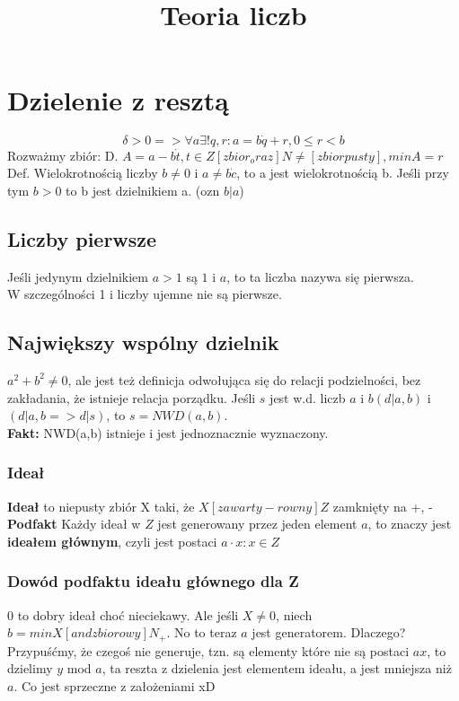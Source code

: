 \documentclass[12pt,a4paper,article]{memoir} %
\title{Teoria liczb}
\author{}
\date{} %
\begin{document}
\maketitle
\tableofcontents* %

\chapter{Dzielenie z resztą}
\[ \delta > 0 => \forall a \exists ! q,r: a = b \dot q + r, 0 \leq r < b \]
Rozważmy zbiór:
D. $ A = {a - b \dot t, t \in Z } [zbior_oraz] N  \neq [zbiorpusty], {min} A = r $ 
Def. Wielokrotnością liczby $ b \neq 0 $ i $ a \neq b \dot c $, to a jest wielokrotnością b.
Jeśli przy tym $ b > 0 $ to b jest dzielnikiem a. (ozn $ b | a $) \\
\section{Liczby pierwsze}
Jeśli jedynym dzielnikiem $a >1$ są $1$ i $a$, to ta liczba nazywa się pierwsza. \\
W szczególności 1 i liczby ujemne nie są pierwsze.
\section{Największy wspólny dzielnik}
$a^2 + b^2 \neq 0$, ale jest też definicja odwołująca się do relacji podzielności, bez zakładania, że istnieje relacja porządku.
Jeśli $s$ jest w.d. liczb $a$ i $b (d | a,b)$ i $(d | a,b => d|s)$, to $s = NWD(a,b)$. \\
\textbf{Fakt:} NWD(a,b) istnieje i jest jednoznacznie wyznaczony.
\subsection{Ideał}
\textbf{Ideał} to niepusty zbiór X taki, że $ X [zawarty-rowny] Z $ zamknięty na +, - \\
\textbf{Podfakt} Każdy ideał w $Z$ jest generowany przez jeden element $a$, to znaczy jest \textbf{ideałem głównym}, czyli jest postaci $a \cdot x: x \in Z$
\subsection{Dowód podfaktu ideału głównego dla Z}
${0}$ to dobry ideał choć nieciekawy. Ale jeśli $X \neq {0}$, niech $ b = min X [andzbiorowy] N_+ $. No to teraz $a$ jest generatorem. Dlaczego? Przypuśćmy, że czegoś nie generuje, tzn. są elementy które nie są postaci $ ax $, to dzielimy $y$ mod $a$, ta reszta z dzielenia jest elementem ideału, a jest mniejsza niż $a$. Co jest sprzeczne z założeniami xD
\end{document}
